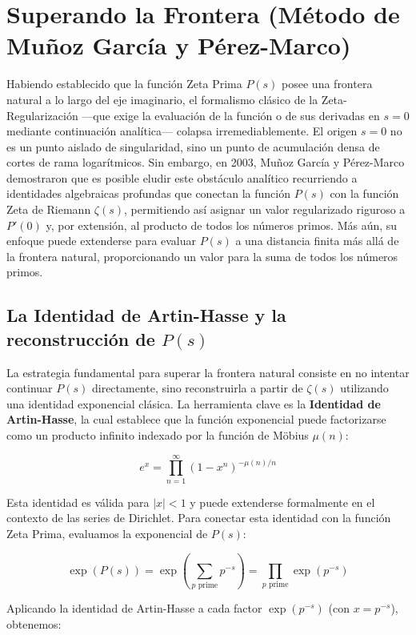 \section{Superando la Frontera (Método de Muñoz García y Pérez-Marco)}

Habiendo establecido que la función Zeta Prima $P(s)$ posee una frontera natural a lo largo del eje imaginario, el formalismo clásico de la Zeta-Regularización —que exige la evaluación de la función o de sus derivadas en $s=0$ mediante continuación analítica— colapsa irremediablemente. El origen $s=0$ no es un punto aislado de singularidad, sino un punto de acumulación densa de cortes de rama logarítmicos. Sin embargo, en 2003, Muñoz García y Pérez-Marco demostraron que es posible eludir este obstáculo analítico recurriendo a identidades algebraicas profundas que conectan la función $P(s)$ con la función Zeta de Riemann $\zeta(s)$, permitiendo así asignar un valor regularizado riguroso a $P'(0)$ y, por extensión, al producto de todos los números primos. Más aún, su enfoque puede extenderse para evaluar $P(s)$ a una distancia finita más allá de la frontera natural, proporcionando un valor para la suma de todos los números primos.

\subsection{La Identidad de Artin-Hasse y la reconstrucción de $P(s)$}

La estrategia fundamental para superar la frontera natural consiste en no intentar continuar $P(s)$ directamente, sino reconstruirla a partir de $\zeta(s)$ utilizando una identidad exponencial clásica. La herramienta clave es la \textbf{Identidad de Artin-Hasse}, la cual establece que la función exponencial puede factorizarse como un producto infinito indexado por la función de Möbius $\mu(n)$:

$$ e^x = \prod_{n=1}^{\infty} \left(1 - x^n\right)^{-\mu(n)/n} $$

Esta identidad es válida para $|x| < 1$ y puede extenderse formalmente en el contexto de las series de Dirichlet. Para conectar esta identidad con la función Zeta Prima, evaluamos la exponencial de $P(s)$:

$$ \exp(P(s)) = \exp\left( \sum_{p \text{ prime}} p^{-s} \right) = \prod_{p \text{ prime}} \exp(p^{-s}) $$

Aplicando la identidad de Artin-Hasse a cada factor $\exp(p^{-s})$ (con $x = p^{-s}$), obtenemos:

